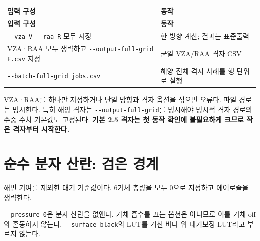 {\TableFont
\begin{longtable}{@{}>{\raggedright\arraybackslash}p{}>{\raggedright\arraybackslash}p{}@{}}
\toprule
\textbf{입력 구성} & \textbf{동작} \\
\midrule
\endfirsthead
\toprule
\textbf{입력 구성} & \textbf{동작} \\
\midrule
\endhead
\bottomrule
\endfoot
\texttt{-\allowbreak{}-\allowbreak{}vza V -\allowbreak{}-\allowbreak{}raa R} 모두 지정 & 한 방향 계산; 결과는 표준출력 \\
VZA·RAA 모두 생략하고 \texttt{-\allowbreak{}-\allowbreak{}output-\allowbreak{}full-\allowbreak{}grid F.\allowbreak{}csv} 지정 & 균일 VZA/RAA 격자 CSV \\
\texttt{-\allowbreak{}-\allowbreak{}batch-\allowbreak{}full-\allowbreak{}grid jobs.\allowbreak{}csv} & 해양 전체 격자 사례를 행 단위로 실행 \\
\end{longtable}
}

VZA·RAA를 하나만 지정하거나 단일 방향과 격자 옵션을 섞으면 오류다. 파일 경로는 명시한다. 특히 해양 격자는 \texttt{-\allowbreak{}-\allowbreak{}output-\allowbreak{}full-\allowbreak{}grid}를 명시해야 명시적 격자 경로의 수중 수치 기본값도 고정된다. \textbf{기본 2.5\textdegree{} 격자는 첫 동작 확인에 불필요하게 크므로 작은 격자부터 시작한다.}

\section{순수 분자 산란: 검은 경계}
\label{sec:auto:04_examples:2}
해면 기여를 제외한 대기 기준값이다. 6기체 총량을 모두 0으로 지정하고 에어로졸을 생략한다.


\par\noindent\begin{minipage}{\linewidth}
\end{minipage}\par

\texttt{-\allowbreak{}-\allowbreak{}pressure 0}은 분자 산란을 없앤다. 기체 흡수를 끄는 옵션은 아니므로 이를 기체 off와 혼동하지 않는다. \texttt{-\allowbreak{}-\allowbreak{}surface black}의 LUT를 거친 바다 위 대기보정 LUT라고 부르지 않는다.

